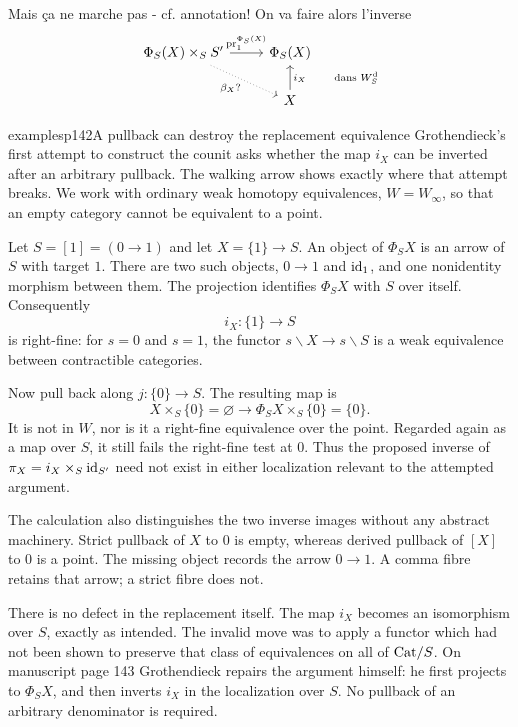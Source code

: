 \leavevmode{}Mais ça ne marche pas - cf. annotation! On va faire alors l'inverse
\[
\begin{tikzcd}
\Phi_S(X)\times_S S' \arrow[r, "\pr_1^{\Phi_S(X)}"] \arrow[dr, dotted, "\beta_X ?"'] & \Phi_S(X) \\
 & X \arrow[u, "{i_X \qquad \text{dans } \Wd_S}"']
\end{tikzcd}
\]

\begin{dcomment}{examples}{p142}{A pullback can destroy the replacement equivalence}
Grothendieck's first attempt to construct the counit asks whether the map $i_X$ can be inverted after an arbitrary pullback. The walking arrow shows exactly where that attempt breaks. We work with ordinary weak homotopy equivalences, $W=W_\infty$, so that an empty category cannot be equivalent to a point.

Let $S=[1]=(0\longrightarrow1)$ and let $X=\{1\}\longrightarrow S$. An object of $\Phi_SX$ is an arrow of $S$ with target $1$. There are two such objects, $0\longrightarrow1$ and $\mathrm{id}_1$, and one nonidentity morphism between them. The projection identifies $\Phi_SX$ with $S$ over itself. Consequently
\[
 i_X:\{1\}\longrightarrow S
\]
is right-fine: for $s=0$ and $s=1$, the functor $s\backslash X\longrightarrow s\backslash S$ is a weak equivalence between contractible categories.

Now pull back along $j:\{0\}\longrightarrow S$. The resulting map is
\[
 X\times_S\{0\}=\varnothing
 \longrightarrow
 \Phi_SX\times_S\{0\}=\{0\}.
\]
It is not in $W$, nor is it a right-fine equivalence over the point. Regarded again as a map over $S$, it still fails the right-fine test at $0$. Thus the proposed inverse of $\pi_X=i_X\times_S\mathrm{id}_{S'}$ need not exist in either localization relevant to the attempted argument.

The calculation also distinguishes the two inverse images without any abstract machinery. Strict pullback of $X$ to $0$ is empty, whereas derived pullback of $[X]$ to $0$ is a point. The missing object records the arrow $0\longrightarrow1$. A comma fibre retains that arrow; a strict fibre does not.

There is no defect in the replacement itself. The map $i_X$ becomes an isomorphism over $S$, exactly as intended. The invalid move was to apply a functor which had not been shown to preserve that class of equivalences on all of $\mathrm{Cat}/S$. On manuscript page 143 Grothendieck repairs the argument himself: he first projects to $\Phi_SX$, and then inverts $i_X$ in the localization over $S$. No pullback of an arbitrary denominator is required.
\end{dcomment}


